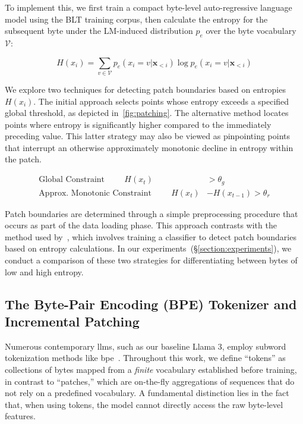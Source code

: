 To implement this, we first train a compact byte-level auto-regressive language model using the {\textsc BLT} training corpus, then calculate the entropy for the subsequent byte under the LM-induced distribution $p_{e}$ over the byte vocabulary $\mathcal{V}$:

\begin{equation}
H(x_i) = \sum_{v \in \mathcal{V}} p_{e}(x_i=v|\pmb{x}_{<i}) \log p_{e}(x_i=v|\pmb{x}_{<i})
\end{equation}

We explore two techniques for detecting patch boundaries based on entropies $H(x_i)$. The initial approach selects points whose entropy exceeds a specified global threshold, as depicted in~\autoref{fig:patching}. The alternative method locates points where entropy is significantly higher compared to the immediately preceding value. This latter strategy may also be viewed as pinpointing points that interrupt an otherwise approximately monotonic decline in entropy within the patch.

\begin{align*}
    \text{Global Constraint}\hspace{1cm}H(x_t)& > \theta_g\\
    \text{Approx. Monotonic Constraint}\hspace{1cm}H(x_t)& - H(x_{t-1}) > \theta_r
\end{align*}

Patch boundaries are determined through a simple preprocessing procedure that occurs as part of the data loading phase. This approach contrasts with the method used by~\citet{nawrot-etal-2023-efficient}, which involves training a classifier to detect patch boundaries based on entropy calculations. In our experiments~(\S\ref{section:experiments}), we conduct a comparison of these two strategies for differentiating between bytes of low and high entropy.

\subsection{The Byte-Pair Encoding (BPE) Tokenizer and Incremental Patching}
\label{section:incremental-patching}
\label{section:bpe-patch}

Numerous contemporary llms, such as our baseline Llama 3, employ subword tokenization methods like bpe~\citep{gage1994new, sennrich-etal-2016-neural}. Throughout this work, we define ``tokens'' as collections of bytes mapped from a \textit{finite} vocabulary established before training, in contrast to ``patches,'' which are on-the-fly aggregations of sequences that do not rely on a predefined vocabulary. A fundamental distinction lies in the fact that, when using tokens, the model cannot directly access the raw byte-level features.

